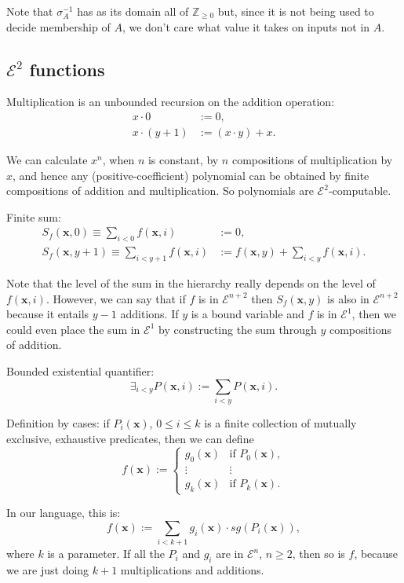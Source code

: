 \documentclass[a4paper]{article}
\newcommand{\grz}[1]{$\mathcal{E}^{#1}$}	%
\newcommand{\Zpos}{\mathbb{Z}_{\geq 0}}
\newcommand{\xvec}{\mathbf{x}}	%
\newcommand{\recur}[1]{\begin{equation} \begin{split} #1 \end{split} \end{equation}}	%
\theoremstyle{plain}
\theoremstyle{definition}
\begin{document}
Note that $\sigma_A^{-1}$ has as its domain all of $\Zpos$ but, since it is not being used to decide membership of $A$, we don't care what value it takes on inputs not in $A$.

\subsection{\grz{2} functions}
Multiplication is an unbounded recursion on the addition operation:
\recur{
	x \cdot 0 &:= 0,				\\
	x \cdot (y+1) &:= (x \cdot y) + x.
}

We can calculate $x^n$, when $n$ is constant, by $n$ compositions of multiplication by $x$, and hence any (positive-coefficient) polynomial can be obtained by finite compositions of addition and multiplication. So polynomials are \grz{2}-computable.

Finite sum:
\recur{
	S_f(\xvec,0) \equiv \sum_{i < 0} f(\xvec, i) &:= 0,		\\
	S_f(\xvec,y+1) \equiv \sum_{i < y+1} f(\xvec,i) &:= f(\xvec,y) + \sum_{i < y} f(\xvec,i).
}

Note that the level of the sum in the hierarchy really depends on the level of $f(\xvec,i)$. However, we can say that if $f$ is in \grz{n+2} then $S_f(\xvec,y)$ is also in \grz{n+2} because it entails $y-1$ additions. If $y$ is a bound variable and $f$ is in \grz{1}, then we could even place the sum in \grz{1} by constructing the sum through $y$ compositions of addition.

Bounded existential quantifier:
\begin{equation} \exists_{i < y} P(\xvec,i) := \sum_{i < y} P(\xvec,i). \end{equation}


Definition by cases: if  $P_i(\xvec)$, $0 \leq i \leq k$ is a finite collection of mutually exclusive, exhaustive predicates, then we can define
\[ f(\xvec) := \begin{cases}
	g_0(\xvec) & \textrm{if }P_0(\xvec),	\\
	\vdots & \vdots	\\
	g_k(\xvec) & \textrm{if } P_k(\xvec).
\end{cases} \]

In our language, this is:
\begin{equation} f(\xvec) := \sum_{i < k+1} g_i(\xvec) \cdot sg(P_i(\xvec)), \end{equation}
where $k$ is a parameter. If all the $P_i$ and $g_i$ are in \grz{n}, $n \geq 2$, then so is $f$, because we are just doing $k+1$ multiplications and additions.  
\end{document}
